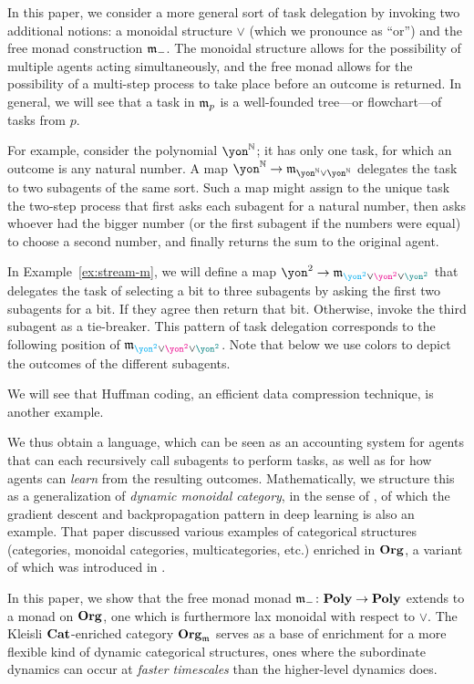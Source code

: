 In this paper, we consider a more general sort of task delegation by invoking two additional notions: a monoidal structure $\vee$ (which we pronounce as ``or'') and the free monad construction $\mathfrak{m}_-$. The monoidal structure allows for the possibility of multiple agents acting simultaneously, and the free monad allows for the possibility of a multi-step process to take place before an outcome is returned. In general, we will see that a task in $\mathfrak{m}_p$ is a well-founded tree---or flowchart---of tasks from $p$. 

For example, consider the polynomial $\yon^\nn$; it has only one task, for which an outcome is any natural number. A map $\yon^\nn\to\free_{\yon^\nn\vee\yon^\nn}$ delegates the task to two subagents of the same sort. Such a map might assign to the unique task the two-step process that first asks each subagent for a natural number, then asks whoever had the bigger number (or the first subagent if the numbers were equal) to choose a second number, and finally returns the sum to the original agent. 

In Example~\ref{ex:stream-m}, we will define a map $\yon ^2 \to \free_{{\color{cyan}\yon^2} \vee {\color{magenta}\yon^2} \vee \color{teal}{\yon^2}}$ that delegates the task of selecting a bit to three subagents by asking the first two subagents for a bit. If they agree then return that bit. Otherwise, invoke the third subagent as a tie-breaker. This pattern of task delegation corresponds to the following position of $\free_{{\color{cyan}\yon^2} \vee {\color{magenta}\yon^2} \vee \color{teal}{\yon^2}}$. Note that below we use colors to depict the outcomes of the different subagents. 

We will see that Huffman coding, an efficient data compression technique, is another example.

We thus obtain a language, which can be seen as an accounting system for agents that can each recursively call subagents to perform tasks, as well as for how agents can \emph{learn} from the resulting outcomes. Mathematically, we structure this as a generalization of \emph{dynamic monoidal category}, in the sense of \cite{shapiro2022dynamic}, of which the gradient descent and backpropagation pattern in deep learning is also an example. That paper discussed various examples of categorical structures (categories, monoidal categories, multicategories, etc.) enriched in $\mathbf{Org}$, a variant of which was introduced in \cite[Def 2.19]{spivak2021learnersv1}. 

In this paper, we show that the free monad monad $\mathfrak{m}_-\colon\mathbf{Poly}\to\mathbf{Poly}$ extends to a monad on $\mathbf{Org}$, one which is furthermore lax monoidal with respect to $\vee$. The Kleisli $\mathbf{Cat}$-enriched category $\mathbf{Org}_{\mathfrak{m}}$ serves as a base of enrichment for a more flexible kind of dynamic categorical structures, ones where the subordinate dynamics can occur at \emph{faster timescales} than the higher-level dynamics does.


